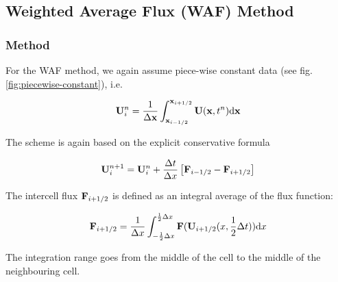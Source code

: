 \subsection{Weighted Average Flux (WAF) Method}







\subsubsection{Method}


For the WAF method, we again assume piece-wise constant data (see fig. \ref{fig:piecewise-constant}), i.e.

\begin{equation}
	\mathbf{U}_i ^ n = \frac{1}{\Delta \mathbf{x}} \int_{\mathbf{x}_{i-1/2}}^{\mathbf{x}_{i+1/2}} \mathbf{U}(\mathbf{x}, t^n) \mathrm{d} \mathbf{x}
\end{equation}

The scheme is again based on the explicit conservative formula

\begin{equation}
	\mathbf{U}_{i}^{n+1} = \mathbf{U}_i^n + \frac{\Delta t}{\Delta x} \left[ \mathbf{F}_{i - 1/2} - \mathbf{F}_{i + 1/2} \right] \label{eq:hydro_basics_waf}
\end{equation}



The intercell flux $\mathbf{F}_{i + 1/2}$ is defined as an integral average of the flux function:

\begin{equation}
	\mathbf{F}_{i + 1/2} = \frac{1}{\Delta x} \int_{-\frac{1}{2} \Delta x} ^{\frac{1}{2} \Delta x} \mathbf{F} (\mathbf{U}_{i+1/2} ( x, \frac{1}{2}\Delta t)) \mathrm{d} x \label{eq:hydro-waf-flux}
\end{equation}

The integration range goes from the middle of the cell to the middle of the neighbouring cell.





